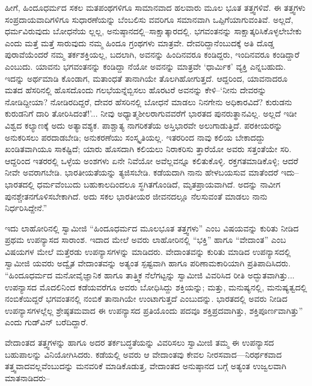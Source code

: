 ಹೀಗೆ, ಹಿಂದೂಧರ್ಮದ ಸಕಲ ಮತಪಂಥಗಳಿಗೂ ಸಾಮಾನವಾದ ಹಲವಾರು ಮೂಲ ಭೂತ ತತ್ತ್ವಗಳಿವೆ. ಈ ತತ್ತ್ವಗಳು ಸಂಪ್ರದಾಯವಾದಿಗಳಿಗೂ ಸುಧಾರಣೆಯನ್ನು ಬೆಂಬಲಿಸು ವವರಿಗೂ ಸಮಾನವಾಗಿ ಒಪ್ಪಿಗೆಯಾಗುವಂತಿವೆ. ಅಲ್ಲದೆ, ಧರ್ಮವಿರುವುದು ಬೋಧನೆಯ ಲ್ಲಲ್ಲ, ಅನುಷ್ಠಾನದಲ್ಲಿ–ಸಾಕ್ಷಾತ್ಕಾರದಲ್ಲಿ. ಭಗವಂತನನ್ನು ಸಾಕ್ಷಾತ್ಕರಿಸಿಕೊಳ್ಳಲೇಬೇಕು ಎಂದು ಮತ್ತೆ ಮತ್ತೆ ಸಾರುವುದು ನಮ್ಮ ಹಿಂದೂ ಗ್ರಂಥಗಳು ಮಾತ್ರವೇ. ದೇವರಿದ್ದಾನೆಂಬುದಕ್ಕೆ ಅತಿ ದೊಡ್ಡ ಪುರಾವೆಯೆಂದರೆ ನಮ್ಮ ತರ್ಕಶಕ್ತಿಯಲ್ಲ, ಬದಲಾಗಿ, ಅವನನ್ನು ಹಿಂದಿನವರೂ ಕಂಡಿದ್ದರು, ಇಂದಿನವರೂ ಕಂಡಿದ್ದಾರೆ ಎಂಬುದು. ಯಾವನು ಭಗವಂತನನ್ನು ಕಂಡಿದ್ದಾ ನೆಯೋ ಅವನನ್ನು ಮಾತ್ರವೇ ‘ಧಾರ್ಮಿಕ’ ವ್ಯಕ್ತಿ ಎನ್ನಬಹುದು. ಇದನ್ನು ಅರ್ಥಮಾಡಿ ಕೊಂಡಾಗ, ಮತಾಂಧತೆ ತಾನಾಗಿಯೇ ತೊಲಗಿಹೋಗುತ್ತದೆ. ಆದ್ದರಿಂದ, ಯಾವನಾದರೂ ಮತದ ಹೆಸರಿನಲ್ಲಿ ಹೊಸದೊಂದು ಗಲಭೆಯನ್ನೆಬ್ಬಿಸಲು ಹೊರಟರೆ ಅವನನ್ನು ಕೇಳಿ–‘ನೀನು ದೇವರನ್ನು ನೋಡಿದ್ದೀಯಾ? ನೋಡಿರದಿದ್ದರೆ, ದೇವರ ಹೆಸರಿನಲ್ಲಿ ಬೋಧನೆ ಮಾಡಲು ನಿನಗೇನು ಅಧಿಕಾರವಿದೆ? ಕುರುಡನು ಕುರುಡನಿಗೆ ದಾರಿ ತೋರಿಸಿದಂತೆ!’... ನೀವು ಅಧ್ಯಾತ್ಮಶೀಲರಾಗುವವರೆಗೆ ಭಾರತದ ಪುನರುತ್ಥಾನವಿಲ್ಲ. ಅಲ್ಲದೆ ಇಡೀ ವಿಶ್ವದ ಕಲ್ಯಾಣಕ್ಕೆ ಅದು ಅತ್ಯಾವಶ್ಯಕ. ಪಾಶ್ಚಾತ್ಯ ನಾಗರಿಕತೆಯ ಅಸ್ತಿಭಾರವೇ ಅಲುಗಾಡುತ್ತಿದೆ. ಪರಕೀಯರನ್ನು ಅನುಕರಿಸಲು ಪರದಾಡಬೇಡಿ; ಅನುಕರಣೆಯು ಸಂಸ್ಕೃತಿಯಲ್ಲ. ಇತರರಿಂದ ನಾವು ಕಲಿಯ ಬೇಕಾದದ್ದು ಖಂಡಿತವಾಗಿಯೂ ಸಾಕಷ್ಟಿದೆ; ಯಾರು ಹೊಸದಾಗಿ ಕಲಿಯಲು ನಿರಾಕರಿಸು ತ್ತಾರೆಯೋ ಅವರು ಸತ್ತಂತೆಯೇ ಸರಿ. ಆದ್ದರಿಂದ ಇತರರಲ್ಲಿ ಒಳ್ಳೆಯ ಅಂಶಗಳು ಏನೇ ನಿವೆಯೋ ಅವೆಲ್ಲವನ್ನೂ ಕಲಿತುಕೊಳ್ಳಿ. ರಕ್ತಗತಮಾಡಿಕೊಳ್ಳಿ; ಆದರೆ ನೀವೇ ಅವರಾಗಬೇಡಿ. ಭಾರತೀಯತೆಯನ್ನು ತ್ಯಜಿಸಬೇಡಿ. ಕಡೆಯದಾಗಿ ನಾನು ಹೇಳಬಯಸುವ ಮಾತೆಂದರೆ ಇದು– ಭಾರತದಲ್ಲಿ ಧರ್ಮವೆಂಬುದು ಬಹುಕಾಲದಿಂದಲೂ ಸ್ಥಗಿತಗೊಂಡಿದೆ, ಮೃತಪ್ರಾಯವಾಗಿದೆ. ಅದನ್ನು ನಾವೀಗ ಪುನಶ್ಚೇತನಗೊಳಿಸಬೇಕಾಗಿದೆ. ಅದು ಸಕಲ ಭಾರತೀಯರ ಜೀವನದಲ್ಲೂ ನೆಲಸುವಂತೆ ಮಾಡಲು ನಾನು ನಿರ್ಧರಿಸಿದ್ದೇನೆ.”

ಇದು ಲಾಹೋರಿನಲ್ಲಿ ಸ್ವಾಮೀಜಿ “ಹಿಂದೂಧರ್ಮದ ಮೂಲಭೂತ ತತ್ತ್ವಗಳು” ಎಂಬ ವಿಷಯವನ್ನು ಕುರಿತು ನೀಡಿದ ಪ್ರಥಮ ಉಪನ್ಯಾಸದ ಸಾರಾಂಶ. ಇದಾದ ಮೇಲೆ ಅವರು ಲಾಹೋರಿನಲ್ಲಿ “ಭಕ್ತಿ” ಹಾಗೂ “ವೇದಾಂತ” ಎಂಬ ವಿಷಯಗಳ ಮೇಲೆ ಮತ್ತೆರಡು ಉಪನ್ಯಾಸಗಳನ್ನು ಮಾಡಿದರು. ವೇದಾಂತವನ್ನು ಕುರಿತು ಮಾಡಿದ ಉಪನ್ಯಾಸದಲ್ಲಿ ಸ್ವಾಮೀಜಿ ಯವರು ಅದ್ವೈತ ವೇದಾಂತವನ್ನು ಅತ್ಯಂತ ಸ್ಪಷ್ಟವಾಗಿ ಹಾಗೂ ಪರಿಣಾಮಕಾರಿಯಾಗಿ ಪ್ರತಿಪಾದಿಸಿದರು. “ಹಿಂದೂಧರ್ಮದ ಮನೋವೈಜ್ಞಾನಿಕ ಹಾಗೂ ತಾತ್ತ್ವಿಕ ನೆಲೆಗಟ್ಟನ್ನು ಸ್ವಾಮೀಜಿ ವಿವರಿಸಿದ ರೀತಿ ಅದ್ಭುತವಾಗಿತ್ತು... ಉಪನ್ಯಾಸದ ಮೊದಲಿನಿಂದ ಕಡೆಯವರೆಗೂ ಅವರು ಬೋಧಿಸಿದ್ದು ಶಕ್ತಿಯನ್ನು; ಮತ್ತು, ಮನುಷ್ಯನಲ್ಲಿ, ಮನುಷ್ಯತ್ವದಲ್ಲಿ ನಂಬಿಕೆಯಿದ್ದರೆ ಭಗವಂತನಲ್ಲಿ ನಂಬಿಕೆ ತಾನಾಗಿಯೇ ಉಂಟಾಗುತ್ತದೆ ಎಂಬುದನ್ನು. ಭಾರತದಲ್ಲಿ ಅವರು ನೀಡಿದ ಉಪನ್ಯಾಸಗಳಲ್ಲೆಲ್ಲ ಶ್ರೇಷ್ಠತಮವಾದ ಈ ಉಪನ್ಯಾಸದ ಪ್ರತಿಯೊಂದು ಪದವೂ ಶಕ್ತಿಪ್ರದವಾಗಿತ್ತು, ಶಕ್ತಿಪೂರ್ಣವಾಗಿತ್ತು” ಎಂದು ಗುಡ್​ವಿನ್ ಬರೆದಿದ್ದಾರೆ.

ವೇದಾಂತದ ತತ್ತ್ವಗಳನ್ನು ಹಾಗೂ ಅದರ ತರ್ಕಬದ್ಧತೆಯನ್ನು ವಿವರಿಸಲು ಸ್ವಾಮೀಜಿ ತಮ್ಮ ಈ ಉಪನ್ಯಾಸದ ಬಹುಪಾಲನ್ನು ವಿನಿಯೋಗಿಸಿದರು. ಕಡೆಯಲ್ಲಿ ಅವರು ಆ ವೇದಾಂತವು ಕೇವಲ ನೀರಸವಾದ—ನಿರರ್ಥಕವಾದ ತತ್ತ್ವವಾದವಲ್ಲವೆಂಬುದನ್ನು ಮನವರಿಕೆ ಮಾಡಿಕೊಡುತ್ತ, ವೇದಾಂತದ ಅನುಷ್ಠಾನದ ಬಗ್ಗೆ ಅತ್ಯಂತ ಉಜ್ವಲವಾಗಿ ಮಾತನಾಡಿದರು–

